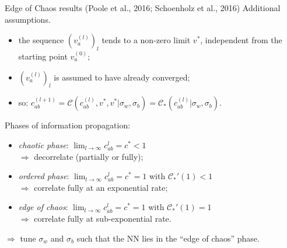 \documentclass[9pt]{beamer}
\begin{document}
\begin{frame}{Edge of Chaos results (Poole et al., 2016; Schoenholz et al., 2016)}
	\alert{Additional assumptions.}
	\begin{itemize}
		\item the sequence $(v_a^{(l)})_l$ tends to a non-zero limit $v^*$, independent from the starting point 
		$v_a^{(0)}$;
		\item $(v_a^{(l)})_l$ is assumed to have already converged; 
		\item so: $c_{ab}^{(l + 1)} = \mathcal{C}(c_{ab}^{(l)}, v^*, v^* | \sigma_w, \sigma_b) = 
		\mathcal{C}_*(c_{ab}^{(l)} | \sigma_w, \sigma_b)$.
	\end{itemize} 
	
	\medskip
	
	\alert{Phases of information propagation:}
	\begin{itemize}
		\item \emph{chaotic phase}: $\lim_{l \rightarrow \infty} c_{ab}^{l} = c^{*} < 1$ \\
			$\Rightarrow$ decorrelate (partially or fully);
		\item \emph{ordered phase}: $\lim_{l \rightarrow \infty} c_{ab}^{l} = c^{*} = 1$ with 
		$\mathcal{C}_*'(1) < 1$ \\
			$\Rightarrow$ correlate fully at an exponential rate;
		\item \emph{edge of chaos}: $\lim_{l \rightarrow \infty} c_{ab}^{l} = c^{*} = 1$ with 
		$\mathcal{C}_*'(1) = 1$ \\
			$\Rightarrow$ correlate fully at sub-exponential rate. 
	\end{itemize}
	$\Rightarrow$ tune $\sigma_w$ and $\sigma_b$ such that the NN lies in the ``edge of chaos'' phase.
\end{frame}
\end{document}
